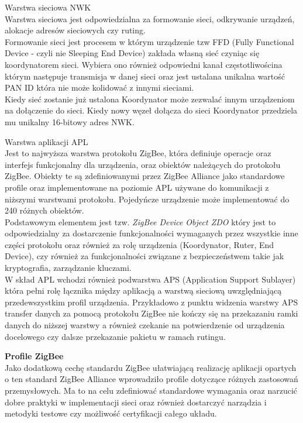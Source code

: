 \par
\tab Warstwa sieciowa NWK\\
Warstwa sieciowa jest odpowiedzialna za formowanie sieci, odkrywanie urządzeń, alokacje adresów sieciowych czy ruting. \\
\tab Formowanie sieci jest procesem w którym urządzenie  tzw FFD (Fully Functional Device - czyli nie Sleeping End Device) zakłada własną sieć czyniąc się koordynatorem sieci. Wybiera ono również odpowiedni kanał częstotliwościna którym następuje transmisja w danej sieci oraz jest ustalana unikalna wartość PAN ID która nie może kolidować z innymi sieciami. \\
Kiedy sieć zostanie już ustalona Koordynator może zezwalać innym urządzeniom na dołączenie do sieci. Kiedy nowy węzeł dołącza do sieci Koordynator przedziela mu unikalny 16-bitowy adres NWK. \\

\par
\tab Warstwa aplikacji APL\\
Jest to najwyższa warstwa protokołu ZigBee, która definiuje operacje oraz interfejs funkcjonalny dla urządzenia, oraz obiektów należących do protokołu ZigBee. Obiekty te są zdefiniowanymi przez ZigBee Alliance jako standardowe profile oraz implementowane na poziomie APL używane do komunikacji z niższymi warstwami protokołu. Pojedyńcze urządzenie może implementować do 240 różnych obiektów. \\
Podstawowym elementem jest tzw. \textit{ZigBee Device Object ZDO} który jest to odpowiedzialny za dostarczenie funkcjonalności wymaganych przez wszystkie inne części protokołu oraz również za rolę urządzenia (Koordynator, Ruter, End Device), czy również za funkcjonalności związane z bezpieczeństwem takie jak kryptografia, zarządzanie kluczami. \\
\tab W skład APL wchodzi również podwarstwa APS (Application Support Sublayer) która pełni rolę łącznika między aplikacją a warstwą sieciową uwzględniającą przedewszystkim profil urządzenia. Przykładowo z punktu widzenia warstwy APS transfer danych za pomocą protokołu ZigBee nie kończy się na przekazaniu ramki danych do niższej warstwy a również czekanie na potwierdzenie od urządzenia docelowego czy dalsze przekazanie pakietu w ramach rutingu. \\

\par
\tab \textbf{Profile ZigBee} \\
Jako dodatkową cechę standardu ZigBee ułatwiającą realizację aplikacji opartych o ten standard ZigBee Alliance wprowadziło profile dotyczące różnych zastosowań przemysłowych. Ma to na celu zdefiniować standardowe wymagania oraz narzucić dobre praktyki w implementacji sieci oraz również dostarczyć narządzia i metodyki testowe czy możliwość certyfikacji całego układu. \\

